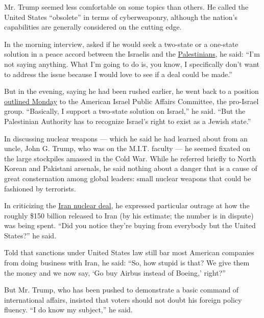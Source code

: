 Mr. Trump seemed less comfortable on some topics than others. He called
the United States ``obsolete'' in terms of cyberweaponry, although the
nation's capabilities are generally considered on the cutting edge.

In the morning interview, asked if he would seek a two-state or a
one-state solution in a peace accord between the Israelis and the
\href{http://topics.nytimes.com/top/reference/timestopics/subjects/p/palestinians/index.html?inline=nyt-classifier}{Palestinians},
he said: ``I'm not saying anything. What I'm going to do is, you know, I
specifically don't want to address the issue because I would love to see
if a deal could be made.''

But in the evening, saying he had been rushed earlier, he went back to a
position
\href{http://www.nytimes.com/politics/first-draft/2016/03/21/donald-trump-calls-himself-lifelong-supporter-of-israel/}{outlined
Monday} to the American Israel Public Affairs Committee, the pro-Israel
group. ``Basically, I support a two-state solution on Israel,'' he said.
``But the Palestinian Authority has to recognize Israel's right to exist
as a Jewish state.''

In discussing nuclear weapons --- which he said he had learned about
from an uncle, John G. Trump, who was on the M.I.T. faculty --- he
seemed fixated on the large stockpiles amassed in the Cold War. While he
referred briefly to North Korean and Pakistani arsenals, he said nothing
about a danger that is a cause of great consternation among global
leaders: small nuclear weapons that could be fashioned by terrorists.

In criticizing the
\href{http://www.nytimes.com/2015/07/15/world/middleeast/iran-nuclear-deal-is-reached-after-long-negotiations.html}{Iran
nuclear deal}, he expressed particular outrage at how the roughly \$150
billion released to Iran (by his estimate; the number is in dispute) was
being spent. ``Did you notice they're buying from everybody but the
United States?'' he said.

Told that sanctions under United States law still bar most American
companies from doing business with Iran, he said: ``So, how stupid is
that? We give them the money and we now say, `Go buy Airbus instead of
Boeing,' right?''

But Mr. Trump, who has been pushed to demonstrate a basic command of
international affairs, insisted that voters should not doubt his foreign
policy fluency. ``I do know my subject,'' he said.

